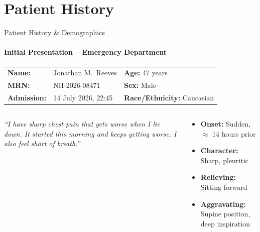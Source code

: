 \section{Patient History}
\begin{frame}{Patient History \& Demographics}
  \framesubtitle{Initial Presentation -- Emergency Department}

  \begin{tcolorbox}[infobox,title={\faUser\hspace{4pt}Patient Demographics}]
    \small
    \begin{tabular}{@{}p{}p{}p{}@{}}
      \textbf{Name:} & Jonathan M.\ Reeves & \textbf{Age:} 47 years \\
      \textbf{MRN:} & NH-2026-08471 & \textbf{Sex:} Male \\
      \textbf{Admission:} & 14 July 2026, 22:45 & \textbf{Race/Ethnicity:} Caucasian \\
    \end{tabular}
  \end{tcolorbox}

  \vspace{0.3cm}

  \begin{columns}[T]
    \begin{tcolorbox}[infobox,title={\faClipboard\hspace{4pt}Chief Complaint}]
      \small\textit{``I have sharp chest pain that gets worse when I lie down. It started this morning and keeps getting worse. I also feel short of breath.''}
    \end{tcolorbox}

    \begin{tcolorbox}[alertbox,title={\faExclamationTriangle\hspace{4pt}Key History}]
      \small
      \begin{itemize}
        \item \textbf{Onset:} Sudden, $\approx$ 14 hours prior
        \item \textbf{Character:} Sharp, pleuritic
        \item \textbf{Relieving:} Sitting forward
        \item \textbf{Aggravating:} Supine position, deep inspiration
      \end{itemize}
    \end{tcolorbox}
  \end{columns}


\end{frame}
